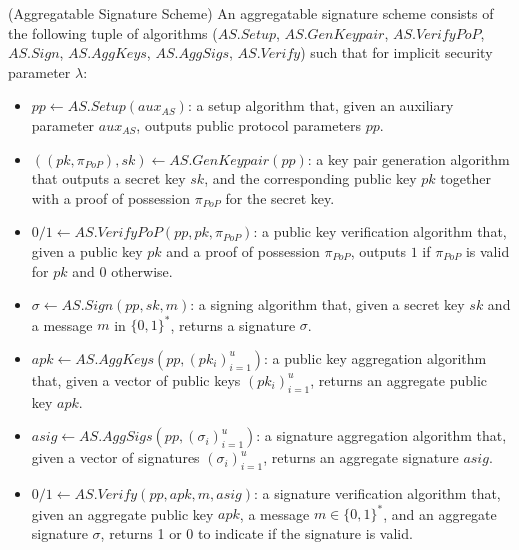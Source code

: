 \begin{definition}
\label{def:aggregate_signatures_long}
(Aggregatable Signature Scheme) An aggregatable signature scheme consists of
the following tuple of algorithms ($\mathit{AS.Setup}$, $\mathit{AS.GenKeypair}$, $\mathit{AS.VerifyPoP}$, 
$\mathit{AS.Sign}$, $\mathit{AS.AggKeys}$, $\mathit{AS.AggSigs}$, $\mathit{AS.Verify}$) 
such that for implicit security parameter $\lambda$:
\begin{itemize}

\item $\mathit{pp} \leftarrow  \mathit{AS.Setup}(\mathit{aux_{\mathit{AS}}})$: a setup algorithm that, given an 
auxiliary parameter $\mathit{aux_{\mathit{AS}}}$, outputs public protocol parameters $\mathit{pp}$. 

\item $((\mathit{pk},\mathit{\pi_{PoP}}),\mathit{sk}) \leftarrow \mathit{AS.GenKeypair}(\mathit{pp})$:
a key pair generation algorithm that
outputs
a secret key $\mathit{sk}$,
and the corresponding public key $\mathit{pk}$
together with a proof of possession $\mathit{\pi_{PoP}}$ for the secret key.

\item $0/1 \leftarrow \mathit{AS.VerifyPoP}(\mathit{pp}, \mathit{pk},\mathit{\pi_{PoP}})$:
a public key verification algorithm that,
given a public key $\mathit{pk}$
and a proof of possession $\mathit{\pi_{PoP}}$,
outputs
$1$ if $\mathit{\pi_{PoP}}$ is valid for $\mathit{pk}$ and $0$ otherwise.

\item $\sigma \leftarrow \mathit{AS.Sign}(\mathit{pp}, \mathit{sk}, m)$:
a signing algorithm that,
given a secret key $\mathit{sk}$ and a message $m$ in $\{0, 1\}^*$, returns a signature $\sigma$.

\item $\mathit{apk} \leftarrow \mathit{AS.AggKeys}(\mathit{pp}, (\mathit{pk_i})_{i=1}^{u})$:
a public key aggregation algorithm that,
given a vector of public keys $(\mathit{pk_i})_{i=1}^u$,
returns
an aggregate public key $\mathit{apk}$.

\item $\mathit{asig} \leftarrow \mathit{AS.AggSigs}(\mathit{pp}, (\sigma_i)_{i=1}^u)$:
a signature aggregation algorithm that,
given a vector of signatures $(\sigma_i)_{i=1}^u$,
returns
an aggregate signature $\mathit{asig}$.

\item $0/1 \leftarrow \mathit{AS.Verify}(\mathit{pp}, \mathit{apk}, m, \mathit{asig})$:
a signature verification algorithm that,
given an aggregate public key $\mathit{apk}$, a message $m \in \{0, 1\}^*$, and an aggregate signature $\sigma$,
returns
1 or 0 to indicate if the signature is valid.
\end{itemize}


\end{definition}

